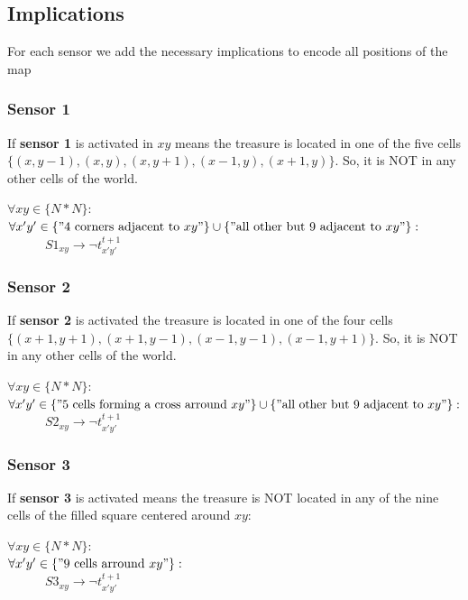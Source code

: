 \documentclass[12pt]{article}
\begin{document}
\pagebreak
\subsection{Implications}
For each sensor we add the necessary implications to encode all
positions of the map

\subsubsection{Sensor 1}
If \textbf{sensor 1} is activated in $xy$ means the treasure is located in one of the five cells $\{(x, y- 1), (x, y), (x, y + 1), (x- 1, y), (x +
	1, y)\}$. So, it is NOT in any other cells of the world.

\begin{tabbing}
	$ \forall xy \in \{N*N\}: $\\
	\hspace{1em} $ \forall x'y' \in \{"\textrm{4 corners adjacent to } xy"\}\cup
		\{"\textrm{all other but 9 adjacent to }xy"\}  :$\\
	$ \hspace{3em} S1_{xy} \rightarrow \lnot t_{x'y'}^{t+1}$
\end{tabbing}

\subsubsection{Sensor 2}
If \textbf{sensor 2} is activated the treasure is located in one of the four cells $\{(x + 1, y + 1), (x + 1, y - 1), (x - 1, y -
	1), (x - 1, y + 1)\}$. So, it is NOT in any other cells of the world.
\begin{tabbing}
	$ \forall xy \in \{N*N\}: $\\
	\hspace{1em} $ \forall x'y' \in \{"\textrm{5 cells forming a cross arround } xy"\}\cup
		\{"\textrm{all other but 9 adjacent to }xy"\}  :$\\
	$ \hspace{3em} S2_{xy} \rightarrow \lnot t_{x'y'}^{t+1}$
\end{tabbing}

\subsubsection{Sensor 3}
If \textbf{sensor 3} is activated means the treasure is NOT located in any of the nine cells of the filled square centered around $xy$:
\begin{tabbing}
	$ \forall xy \in \{N*N\}: $\\
	\hspace{1em} $ \forall x'y' \in \{"\textrm{9 cells arround } xy"\}:$\\
	$ \hspace{3em} S3_{xy} \rightarrow \lnot t_{x'y'}^{t+1}$
\end{tabbing}
\end{document}
